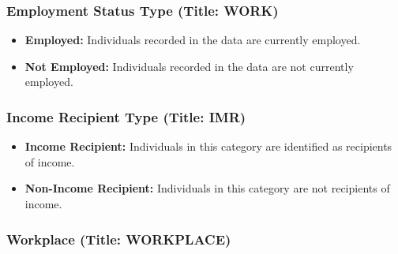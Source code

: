 \documentclass[twocolumn]{article}
\begin{document}
	\subsubsection{Employment Status Type (Title: WORK)}

\begin{itemize}
    \item \textbf{Employed:} Individuals recorded in the data are currently employed.
    \item \textbf{Not Employed:} Individuals recorded in the data are not currently employed.
\end{itemize}

	\subsubsection{Income Recipient Type (Title: IMR)}

\begin{itemize}
    \item \textbf{Income Recipient:} Individuals in this category are identified as recipients of income.
    \item \textbf{Non-Income Recipient:} Individuals in this category are not recipients of income.
\end{itemize}

	\subsubsection{Workplace (Title: WORKPLACE)}
\end{document}
